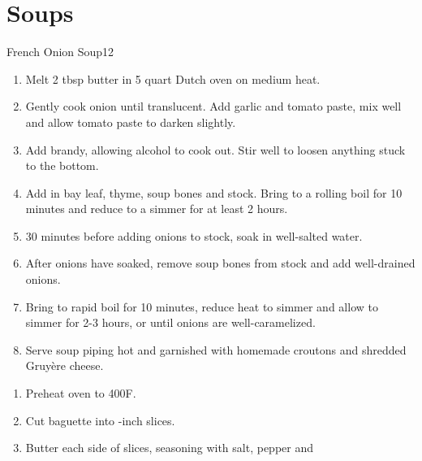 \chapter{Soups}
\label{cha:soups}

\begin{recipe}{French Onion Soup}{}{12}
  \begin{ingredients}
  \end{ingredients}
  \begin{enumerate}
  \item Melt 2 tbsp butter in 5 quart Dutch oven on medium heat.
  \item Gently cook onion until translucent.  Add garlic and tomato
    paste, mix well and allow tomato paste to darken slightly.
  \item Add brandy, allowing alcohol to cook out.  Stir well to loosen
    anything stuck to the bottom.
  \item Add in bay leaf, thyme, soup bones and stock.  Bring to a
    rolling boil for 10 minutes and reduce to a simmer for at least 2
    hours.
  \item 30 minutes before adding onions to stock, soak in well-salted
    water.
  \item After onions have soaked, remove soup bones from stock and add
    well-drained onions.
  \item Bring to rapid boil for 10 minutes, reduce heat to simmer and
    allow to simmer for 2-3 hours, or until onions are
    well-caramelized.
  \item Serve soup piping hot and garnished with homemade croutons and
    shredded Gruy\`ere cheese.
  \end{enumerate}
  \begin{enumerate}
  \item Preheat oven to 400F.
  \item Cut baguette into \half-inch slices.
  \item Butter each side of slices, seasoning with salt, pepper and

\end{enumerate}
\end{recipe}
